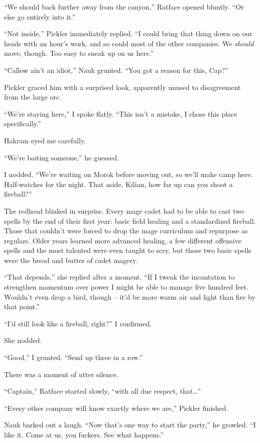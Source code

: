 \documentclass[12pt, openany]{book}
\begin{document}
“We should back further away from the canyon,” Ratface opened bluntly. “Or else go entirely into it.”

“Not inside,” Pickler immediately replied. “I could bring that thing down on our heads with an hour’s work, and so could most of the other companies. We \textit{should} move, though. Too easy to sneak up on us here.”

“Callow ain’t an idiot,” Nauk grunted. “You got a reason for this, Cap?”

Pickler graced him with a surprised look, apparently unused to disagreement from the large orc.

“We’re staying here,” I spoke flatly. “This isn’t a mistake, I chose this place specifically.”

Hakram eyed me carefully.

“We’re baiting someone,” he guessed.

I nodded. “We’re waiting on Morok before moving out, so we’ll make camp here. Half-watches for the night. That aside, Kilian, how far up can you shoot a fireball?”

The redhead blinked in surprise. Every mage cadet had to be able to cast two spells by the end of their first year: basic field healing and a standardized fireball. Those that couldn’t were forced to drop the mage curriculum and repurpose as regulars. Older years learned more advanced healing, a few different offensive spells and the most talented were even taught to scry, but those two basic spells were the bread and butter of cadet magery.

“That depends,” she replied after a moment. “If I tweak the incantation to strengthen momentum over power I might be able to manage five hundred feet. Wouldn’t even drop a bird, though – it’d be more warm air and light than fire by that point.”

“I’d still look like a fireball, right?” I confirmed.

She nodded.

“Good,” I grunted. “Send up three in a row.”

There was a moment of utter silence.

“Captain,” Ratface started slowly, “with all due respect, that…”

“Every other company will know exactly where we are,” Pickler finished.

Nauk barked out a laugh. “Now that’s one way to start the party,” he growled. “I like it. Come at us, you fuckers. See what happens.”
\end{document}
